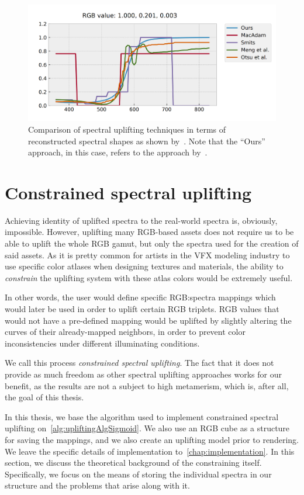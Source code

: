 \begin{figure}[t!]
	\centering
	\includegraphics[width=0.8\linewidth]{img/upsampling_techniques.png}
	\caption{Comparison of spectral uplifting techniques in terms of reconstructed spectral shapes as shown by~\citet{upsamplingJakobHanika}. Note that the ``Ours'' approach, in this case, refers to the approach by~\citet{upsamplingJakobHanika}.}
	\label{fig:upliftingTechniques}
\end{figure}

\section{Constrained spectral uplifting}

Achieving identity of uplifted spectra to the real-world spectra is, obviously, impossible. However, uplifting many RGB-based assets does not require us to be able to uplift the whole RGB gamut, but only the spectra used for the creation of said assets. As it is pretty common for artists in the VFX modeling industry to use specific color atlases when designing textures and materials, the ability to \emph{constrain} the uplifting system with these atlas colors would be extremely useful.

In other words, the user would define specific RGB:spectra mappings which would later be used in order to uplift certain RGB triplets. RGB values that would not have a pre-defined mapping would be uplifted by slightly altering the curves of their already-mapped neighbors, in order to prevent color inconsistencies under different illuminating conditions.

We call this process \emph{constrained spectral uplifting}. The fact that it does not provide as much freedom as other spectral uplifting approaches works for our benefit, as the results are not a subject to high metamerism, which is, after all, the goal of this thesis.

In this thesis, we base the algorithm used to implement constrained spectral uplifting on~\cref{alg:upliftingAlgSigmoid}. We also use an RGB cube as a structure for saving the mappings, and we also create an uplifting model prior to rendering. We leave the specific details of implementation to~\cref{chap:implementation}. In this section, we discuss the theoretical background of the constraining itself. Specifically, we focus on the means of storing the individual spectra in our structure and the problems that arise along with it.

